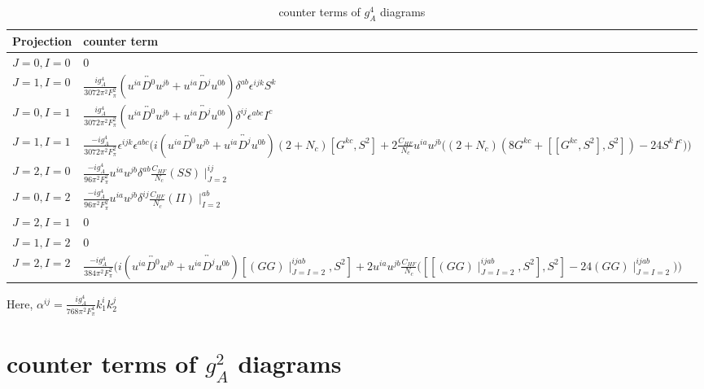 \documentclass{article}
\begin{document}
\bgroup
\def\arraystretch{2.5}%
\begin{table}
	[ht]
	\caption{counter terms of $g_A^4$ diagrams}\label{table:gA4} 
	\begin{tabular}{ M{2.0cm} M{10cm}}
		\hline 
		Projection  & counter term \\
		\hline 
		$J=0,I=0$ &  $ 0 $  \\ 
		$J=1,I=0$ &  $   \frac{ig_A^4}{3072 \pi^2 F_\pi^2} \left( u^{ia}\overleftrightarrow{D^0} u^{jb}  + u^{ia}\overleftrightarrow{D^j} u^{0b} \right) \delta^{ab} \epsilon^{ijk} S^k$  \\ 
		$J=0,I=1$ &  $  \frac{ig_A^4}{3072 \pi^2 F_\pi^2} \left( u^{ia}\overleftrightarrow{D^0} u^{jb}  + u^{ia}\overleftrightarrow{D^j} u^{0b} \right)  \delta^{ij} \epsilon^{abc} I^c$  \\ 
		$J=1,I=1$ &  $  \frac{-ig_A^4}{3072 \pi^2 F_\pi^2} \epsilon^{ijk} \epsilon^{abc} \bigg(i\left( u^{ia}\overleftrightarrow{D^0} u^{jb}  + u^{ia}\overleftrightarrow{D^j} u^{0b} \right) \left(2+N_c\right) \left[G^{kc},S^2\right] +2\frac{C_{HF}}{N_c} u^{ia}u^{jb}\bigg( \left(2+N_c\right) \left( 8G^{kc}+ \left[ \left[G^{kc},S^2 \right],S^2\right] \right)-24 S^kI^c \bigg)  \bigg)   $\\
		$J=2,I=0$ &  $  \frac{-ig_A^4}{96 \pi^2 F_\pi^2} u^{ia}u^{jb} \delta^{ab} \frac{C_{HF}}{N_c} \left(SS\right)\mid_{J=2}^{ij} $  \\ 
		$J=0,I=2$ &  $  \frac{-ig_A^4}{96 \pi^2 F_\pi^2} u^{ia}u^{jb} \delta^{ij} \frac{C_{HF}}{N_c} \left(II\right)\mid_{I=2}^{ab} $  \\ 
		$J=2,I=1$ &  $  0 $  \\ 
		$J=1,I=2$ &  $  0 $  \\ 
		$J=2,I=2$ &  $  \frac{-ig_A^4}{384 \pi^2 F_\pi^2} \bigg(  i \left( u^{ia}\overleftrightarrow{D^0} u^{jb}  + u^{ia}\overleftrightarrow{D^j} u^{0b} \right) \left[ \left(GG\right)\mid_{J=I=2}^{ijab},S^2 \right] +2 u^{ia}u^{jb} \frac{C_{HF}}{N_c}  \bigg( \left[\left[ \left(GG\right)\mid_{J=I=2}^{ijab},S^2 \right],S^2\right] -24\left(GG\right)\mid_{J=I=2}^{ijab}   \bigg) \bigg) $  \\ 
		\hline
	\end{tabular}
\end{table}
\egroup

Here, $\alpha^{ij} = \frac{ig_A^4}{768 \pi^2 F_\pi^4} k_1^i k_2^j $





\newpage
\section{counter terms of $g_A^2$ diagrams}
\end{document}
